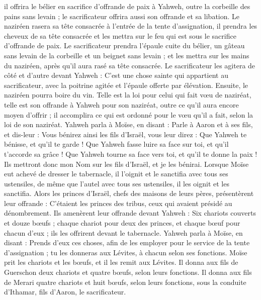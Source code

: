 \begin{multicols}{2}
il offrira le bélier en sacrifice d’offrande de paix à Yahweh, outre la corbeille des pains sans levain ; le sacrificateur offrira aussi son offrande et sa libation.
Le naziréen rasera sa tête consacrée à l'entrée de la tente d'assignation, il prendra les cheveux de sa tête consacrée et les mettra sur le feu qui est sous le sacrifice d’offrande de paix.
Le sacrificateur prendra l'épaule cuite du bélier, un gâteau sans levain de la corbeille et un beignet sans levain ; et les mettra sur les mains du naziréen, après qu'il aura rasé sa tête consacrée.
Le sacrificateur les agitera de côté et d’autre devant Yahweh : C'est une chose sainte qui appartient au sacrificateur, avec la poitrine agitée et l'épaule offerte par élévation. Ensuite, le naziréen pourra boire du vin.
Telle est la loi pour celui qui fait vœu de naziréat, telle est son offrande à Yahweh pour son naziréat, outre ce qu'il aura encore moyen d'offrir ; il accomplira ce qui est ordonné pour le vœu qu'il a fait, selon la loi de son naziréat.
Yahweh parla à Moïse, en disant :
Parle à Aaron et à ses fils, et dis-leur : Vous bénirez ainsi les fils d'Israël, vous leur direz :
Que Yahweh te bénisse, et qu’il te garde !
Que Yahweh fasse luire sa face sur toi, et qu’il t’accorde sa grâce !
Que Yahweh tourne sa face vers toi, et qu’il te donne la paix !
Ils mettront donc mon Nom sur les fils d'Israël, et je les bénirai.
\VerseOne{}Lorsque Moïse eut achevé de dresser le tabernacle, il l’oignit et le sanctifia avec tous ses ustensiles, de même que l'autel avec tous ses ustensiles, il les oignit et les sanctifia.
Alors les princes d'Israël, chefs des maisons de leurs pères, présentèrent leur offrande : C’étaient les princes des tribus, ceux qui avaient présidé au dénombrement.
Ils amenèrent leur offrande devant Yahweh : Six chariots couverts et douze bœufs ; chaque chariot pour deux des princes, et chaque bœuf pour chacun d'eux ; ils les offrirent devant le tabernacle.
Yahweh parla à Moïse, en disant :
Prends d’eux ces choses, afin de les employer pour le service de la tente d'assignation ; tu les donneras aux Lévites, à chacun selon ses fonctions.
Moïse prit les chariots et les bœufs, et il les remit aux Lévites.
Il donna aux fils de Guerschon deux chariots et quatre bœufs, selon leurs fonctions.
Il donna aux fils de Merari quatre chariots et huit bœufs, selon leurs fonctions, sous la conduite d'Ithamar, fils d'Aaron, le sacrificateur.

\end{multicols}
